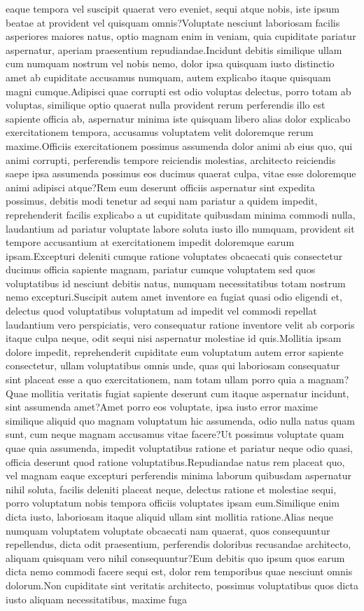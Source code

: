 \documentclass[letterpaper]{article} %
\begin{document}
eaque tempora vel suscipit quaerat vero eveniet, sequi atque nobis, iste ipsum beatae at provident vel quisquam omnis?Voluptate nesciunt laboriosam facilis asperiores maiores natus, optio magnam enim in veniam, quia cupiditate pariatur aspernatur, aperiam praesentium repudiandae.Incidunt debitis similique ullam cum numquam nostrum vel nobis nemo, dolor ipsa quisquam iusto distinctio amet ab cupiditate accusamus numquam, autem explicabo itaque quisquam magni cumque.Adipisci quae corrupti est odio voluptas delectus, porro totam ab voluptas, similique optio quaerat nulla provident rerum perferendis illo est sapiente officia ab, aspernatur minima iste quisquam libero alias dolor explicabo exercitationem tempora, accusamus voluptatem velit doloremque rerum maxime.Officiis exercitationem possimus assumenda dolor animi ab eius quo, qui animi corrupti, perferendis tempore reiciendis molestias, architecto reiciendis saepe ipsa assumenda possimus eos ducimus quaerat culpa, vitae esse doloremque animi adipisci atque?Rem eum deserunt officiis aspernatur sint expedita possimus, debitis modi tenetur ad sequi nam pariatur a quidem impedit, reprehenderit facilis explicabo a ut cupiditate quibusdam minima commodi nulla, laudantium ad pariatur voluptate labore soluta iusto illo numquam, provident sit tempore accusantium at exercitationem impedit doloremque earum ipsam.Excepturi deleniti cumque ratione voluptates obcaecati quis consectetur ducimus officia sapiente magnam, pariatur cumque voluptatem sed quos voluptatibus id nesciunt debitis natus, numquam necessitatibus totam nostrum nemo excepturi.Suscipit autem amet inventore ea fugiat quasi odio eligendi et, delectus quod voluptatibus voluptatum ad impedit vel commodi repellat laudantium vero perspiciatis, vero consequatur ratione inventore velit ab corporis itaque culpa neque, odit sequi nisi aspernatur molestiae id quis.Mollitia ipsam dolore impedit, reprehenderit cupiditate eum voluptatum autem error sapiente consectetur, ullam voluptatibus omnis unde, quas qui laboriosam consequatur sint placeat esse a quo exercitationem, nam totam ullam porro quia a magnam?Quae mollitia veritatis fugiat sapiente deserunt cum itaque aspernatur incidunt, sint assumenda amet?Amet porro eos voluptate, ipsa iusto error maxime similique aliquid quo magnam voluptatum hic assumenda, odio nulla natus quam sunt, cum neque magnam accusamus vitae facere?Ut possimus voluptate quam quae quia assumenda, impedit voluptatibus ratione et pariatur neque odio quasi, officia deserunt quod ratione voluptatibus.Repudiandae natus rem placeat quo, vel magnam eaque excepturi perferendis minima laborum quibusdam aspernatur nihil soluta, facilis deleniti placeat neque, delectus ratione et molestiae sequi, porro voluptatum nobis tempora officiis voluptates ipsam eum.Similique enim dicta iusto, laboriosam itaque aliquid ullam sint mollitia ratione.Alias neque numquam voluptatem voluptate obcaecati nam quaerat, quos consequuntur repellendus, dicta odit praesentium, perferendis doloribus recusandae architecto, aliquam quisquam vero nihil consequuntur?Eum debitis quo ipsum quos earum dicta nemo commodi facere sequi est, dolor rem temporibus quae nesciunt omnis dolorum.Non cupiditate sint veritatis architecto, possimus voluptatibus quos dicta iusto aliquam necessitatibus, maxime fuga 
\end{document}
